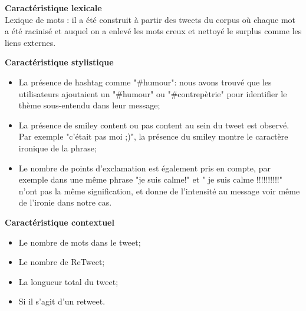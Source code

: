 \documentclass[10pt,a4paper,twoside]{article}
\begin{document}
\textbf{Caractéristique lexicale}\\
Lexique de mots : il a été construit à partir des tweets du corpus où chaque mot a été racinisé et auquel on a enlevé les mots creux et nettoyé le surplus comme les liens externes.
\vspace{0.5cm}

\textbf{Caractéristique stylistique}
\begin{itemize}
\item La présence de hashtag comme "\#humour": nous avons trouvé que les utilisateurs ajoutaient un "\#humour" ou "\#contrepètrie" pour identifier le thème sous-entendu dans leur message;
\item La présence de smiley content ou pas content au sein du tweet est observé. Par exemple "c'était pas moi ;)", la présence du smiley montre le caractère ironique de la phrase;
\item Le nombre de points d'exclamation est également pris en compte, par exemple dans une même phrase "je suis calme!" et " je suis calme !!!!!!!!!!" n'ont pas la même signification, et donne de l'intensité au message voir même de l'ironie dans notre cas. 
\end{itemize}
\vspace{0.5cm}

\textbf{Caractéristique contextuel}
\begin{itemize}
\item Le nombre de mots dans le tweet;
\item Le nombre de ReTweet;
\item La longueur total du tweet;
\item Si il s'agit d'un retweet.
\end{itemize}
\vspace{0.5cm}
\end{document}
